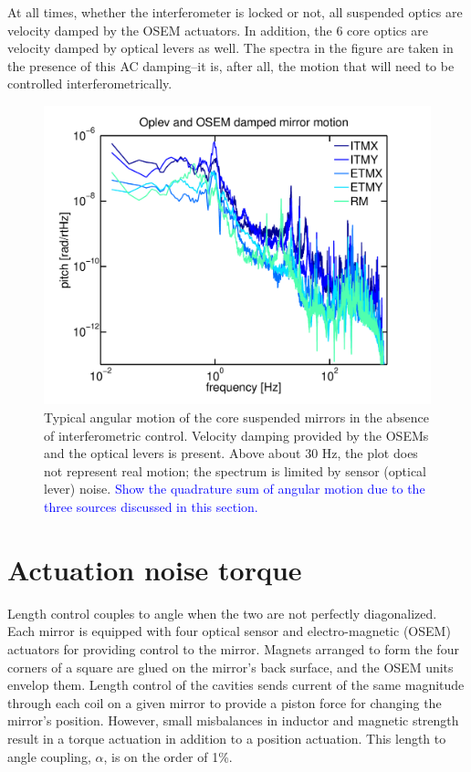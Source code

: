 At all times, whether the interferometer is locked or not, all
suspended optics are velocity damped by the OSEM actuators. In
addition, the 6 core optics are velocity damped by optical levers as
well. The spectra in the figure are taken in the presence of this AC
damping--it is, after all, the motion that will need to be controlled
interferometrically.


\begin{figure}
\begin{centering}
\includegraphics[width=0.7\columnwidth]{figures/ifodark_mirrormotion.pdf}
\caption{Typical angular motion of the core suspended mirrors in the
  absence of interferometric control. Velocity damping provided by the
  OSEMs and the optical levers is present. Above about 30 Hz, the plot
  does not represent real motion; the spectrum is limited by sensor
  (optical lever) noise. \textcolor{blue}{Show the quadrature sum of
    angular motion due to the three sources discussed in this
    section.}}
\label{fig:seismicMirror}
\end{centering}
\end{figure}


\section{Actuation noise torque}
Length control couples to angle when the two are not perfectly
diagonalized.  Each mirror is equipped with four optical sensor and
electro-magnetic (OSEM) actuators for providing control to the
mirror. Magnets arranged to form the four corners of a square are
glued on the mirror's back surface, and the OSEM units envelop
them. Length control of the cavities sends current of the same
magnitude through each coil on a given mirror to provide a piston
force for changing the mirror's position. However, small misbalances
in inductor and magnetic strength result in a torque actuation in
addition to a position actuation. This length to angle coupling,
$\alpha$, is on the order of 1\%.

